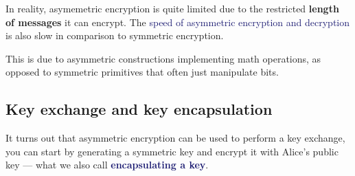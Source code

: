 \documentclass[dvipsnames]{article}
\newcommand{\mycola}{MidnightBlue}
\newcommand{\cola}[1]{\textcolor{\mycola}{#1}}
\newcommand{\Cola}[1]{\textcolor{\mycola}{\textbf{#1}}}
\newcommand\uptodown[3][-o]{\draw[very thick,#1](#2.south) to [out=270,in=90] (#3.north);}
\begin{document}
In reality, asymemetric encryption is quite limited due to the restricted\textbf{ length
of messages} it can encrypt. The \cola{speed of asymmetric encryption and
decryption} is also slow in comparison to symmetric encryption.

This is due to asymmetric constructions implementing math operations, as opposed
to symmetric primitives that often just manipulate bits.

\subsection{Key exchange and key encapsulation}
It turns out that asymmetric encryption can be used to perform a key exchange,
you can start by generating a symmetric key and encrypt it with Alice's public
key --- what we also call \Cola{encapsulating a key}.

\begin{center}
\end{center}

\begin{center}
  
\end{center}
\end{document}
